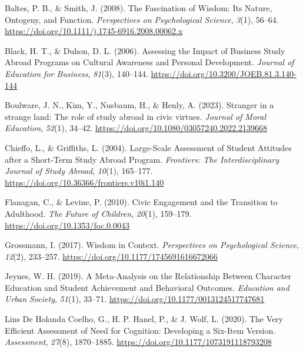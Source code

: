 \documentclass[
  man,
  floatsintext,
  longtable,
  nolmodern,
  notxfonts,
  notimes,
  colorlinks=true,linkcolor=blue,citecolor=blue,urlcolor=blue]{apa7}
\newlength{\cslhangindent}
\newenvironment{CSLReferences}[2] %
 {\begin{list}{}{%
  \setlength{\itemindent}{0pt}
  \setlength{\leftmargin}{0pt}
  \setlength{\parsep}{0pt}
  \ifodd #1
   \setlength{\leftmargin}{\cslhangindent}
   \setlength{\itemindent}{-1\cslhangindent}
  \fi
  \setlength{\itemsep}{#2\baselineskip}}}
 {\end{list}}
\begin{document}
\label{refs}
\begin{CSLReferences}{1}{0}
Baltes, P. B., \& Smith, J. (2008). The {Fascination} of {Wisdom}: {Its
Nature}, {Ontogeny}, and {Function}. \emph{Perspectives on Psychological
Science}, \emph{3}(1), 56--64.
\url{https://doi.org/10.1111/j.1745-6916.2008.00062.x}

Black, H. T., \& Duhon, D. L. (2006). Assessing the {Impact} of
{Business Study Abroad Programs} on {Cultural Awareness} and {Personal
Development}. \emph{Journal of Education for Business}, \emph{81}(3),
140--144. \url{https://doi.org/10.3200/JOEB.81.3.140-144}

Boulware, J. N., Kim, Y., Nusbaum, H., \& Henly, A. (2023). Stranger in
a strange land: {The} role of study abroad in civic virtues.
\emph{Journal of Moral Education}, \emph{52}(1), 34--42.
\url{https://doi.org/10.1080/03057240.2022.2139668}

Chieffo, L., \& Griffiths, L. (2004). Large-{Scale Assessment} of
{Student Attitudes} after a {Short-Term Study Abroad Program}.
\emph{Frontiers: The Interdisciplinary Journal of Study Abroad},
\emph{10}(1), 165--177.
\url{https://doi.org/10.36366/frontiers.v10i1.140}

Flanagan, C., \& Levine, P. (2010). Civic {Engagement} and the
{Transition} to {Adulthood}. \emph{The Future of Children},
\emph{20}(1), 159--179. \url{https://doi.org/10.1353/foc.0.0043}

Grossmann, I. (2017). Wisdom in {Context}. \emph{Perspectives on
Psychological Science}, \emph{12}(2), 233--257.
\url{https://doi.org/10.1177/1745691616672066}

Jeynes, W. H. (2019). A {Meta-Analysis} on the {Relationship Between
Character Education} and {Student Achievement} and {Behavioral
Outcomes}. \emph{Education and Urban Society}, \emph{51}(1), 33--71.
\url{https://doi.org/10.1177/0013124517747681}

Lins De Holanda Coelho, G., H. P. Hanel, P., \& J. Wolf, L. (2020). The
{Very Efficient Assessment} of {Need} for {Cognition}: {Developing} a
{Six-Item Version}. \emph{Assessment}, \emph{27}(8), 1870--1885.
\url{https://doi.org/10.1177/1073191118793208}


\end{CSLReferences}
\end{document}
